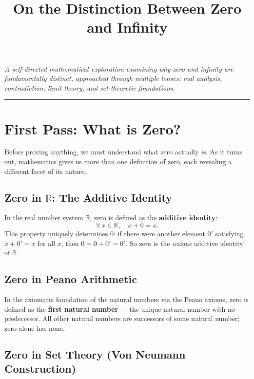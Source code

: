 \documentclass[12pt, a4paper]{article}
\title{\textbf{On the Distinction Between Zero and Infinity}}
\author{}
\date{}
\theoremstyle{definition}
\theoremstyle{remark}
\begin{document}
\maketitle
\tableofcontents
\vspace{1cm}

\noindent\textit{A self-directed mathematical exploration examining why zero and infinity are fundamentally distinct, approached through multiple lenses: real analysis, contradiction, limit theory, and set-theoretic foundations.}

\vspace{0.5cm}
\hrule
\vspace{0.8cm}

\section{First Pass: What is Zero?}

Before proving anything, we must understand what zero actually \textit{is}. As it turns out, mathematics gives us more than one definition of zero, each revealing a different facet of its nature.

\subsection{Zero in $\mathbb{R}$: The Additive Identity}

In the real number system $\mathbb{R}$, zero is defined as the \textbf{additive identity}:
\[
\forall\, x \in \mathbb{R},\quad x + 0 = x.
\]
This property uniquely determines $0$: if there were another element $0'$ satisfying $x + 0' = x$ for all $x$, then $0 = 0 + 0' = 0'$. So zero is the \emph{unique} additive identity of $\mathbb{R}$.

\subsection{Zero in Peano Arithmetic}

In the axiomatic foundation of the natural numbers via the Peano axioms, zero is defined as the \textbf{first natural number} — the unique natural number with no predecessor. All other natural numbers are successors of some natural number; zero alone has none.

\subsection{Zero in Set Theory (Von Neumann Construction)}
\end{document}

